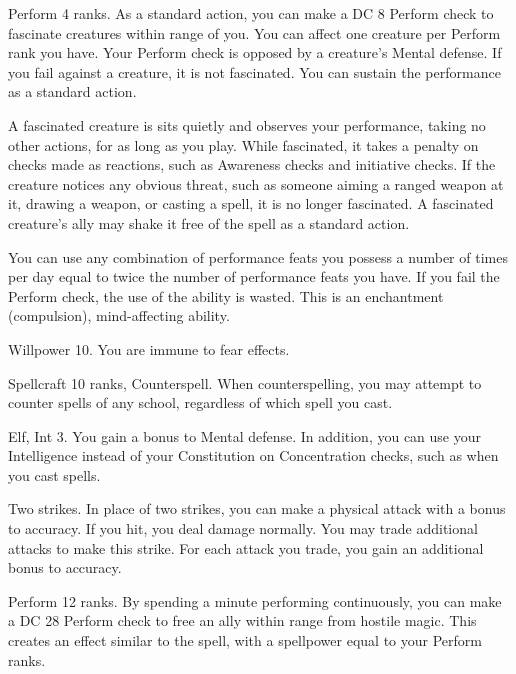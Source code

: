 \featpre Perform 4 ranks.
\featben As a standard action, you can make a DC 8 Perform check to fascinate creatures within \rngmed range of you.
You can affect one creature per Perform rank you have.
Your Perform check is opposed by a creature's Mental defense.
If you fail against a creature, it is not fascinated.
You can sustain the performance as a standard action.

A fascinated creature is sits quietly and observes your performance, taking no other actions, for as long as you play.
While fascinated, it takes a  penalty on checks made as reactions, such as Awareness checks and initiative checks.
If the creature notices any obvious threat, such as someone aiming a ranged weapon at it, drawing a weapon, or casting a spell, it is no longer fascinated.
A fascinated creature's ally may shake it free of the spell as a standard action.

You can use any combination of performance feats you possess a number of times per day equal to twice the number of performance feats you have.
If you fail the Perform check, the use of the ability is wasted.
This is an enchantment (compulsion), mind-affecting ability.

\featpre Willpower 10.
\featben You are immune to fear effects.

\featpres Spellcraft 10 ranks, Counterspell.
\featben When counterspelling, you may attempt to counter spells of any school, regardless of which spell you cast.

\featpre Elf, Int 3.
\featben You gain a  bonus to Mental defense.
In addition, you can use your Intelligence instead of your Constitution on Concentration checks, such as when you cast spells.

\featpre Two strikes.
\featben In place of two strikes, you can make a physical attack with a  bonus to accuracy.
If you hit, you deal damage normally.
You may trade additional attacks to make this strike.
For each attack you trade, you gain an additional  bonus to accuracy.

\featpre Perform 12 ranks.
\featben By spending a minute performing continuously, you can make a DC 28 Perform check to free an ally within \rngmed range from hostile magic.
This creates an effect similar to the 
spell, with a spellpower equal to your Perform ranks.

